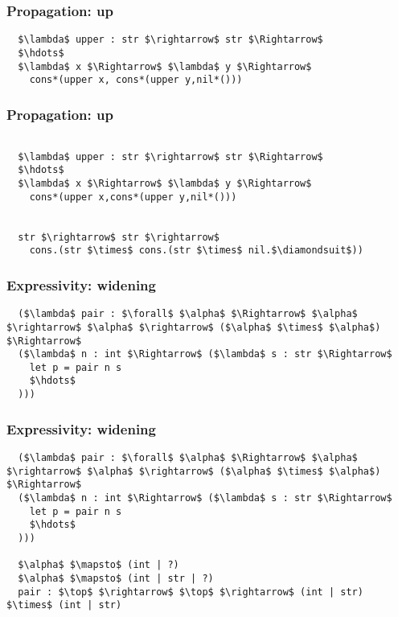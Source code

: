 \documentclass{beamer}
\begin{document}
\begin{frame}[fragile]
  \frametitle{Propagation: up}

  \begin{lstlisting}
  $\lambda$ upper : str $\rightarrow$ str $\Rightarrow$
  $\hdots$
  $\lambda$ x $\Rightarrow$ $\lambda$ y $\Rightarrow$
    cons*(upper x, cons*(upper y,nil*()))
  \end{lstlisting}

\end{frame}

\begin{frame}[fragile]
  \frametitle{Propagation: up}

  \begin{lstlisting}

  $\lambda$ upper : str $\rightarrow$ str $\Rightarrow$
  $\hdots$
  $\lambda$ x $\Rightarrow$ $\lambda$ y $\Rightarrow$
    cons*(upper x,cons*(upper y,nil*()))


  str $\rightarrow$ str $\rightarrow$
    cons.(str $\times$ cons.(str $\times$ nil.$\diamondsuit$))
  \end{lstlisting}

\end{frame}

\begin{frame}[fragile]
  \frametitle{Expressivity: widening}

  \begin{lstlisting}
  ($\lambda$ pair : $\forall$ $\alpha$ $\Rightarrow$ $\alpha$ $\rightarrow$ $\alpha$ $\rightarrow$ ($\alpha$ $\times$ $\alpha$) $\Rightarrow$ 
  ($\lambda$ n : int $\Rightarrow$ ($\lambda$ s : str $\Rightarrow$ 
    let p = pair n s
    $\hdots$
  )))

  \end{lstlisting}
\end{frame}


\begin{frame}[fragile]
  \frametitle{Expressivity: widening}

  \begin{lstlisting}
  ($\lambda$ pair : $\forall$ $\alpha$ $\Rightarrow$ $\alpha$ $\rightarrow$ $\alpha$ $\rightarrow$ ($\alpha$ $\times$ $\alpha$) $\Rightarrow$ 
  ($\lambda$ n : int $\Rightarrow$ ($\lambda$ s : str $\Rightarrow$ 
    let p = pair n s
    $\hdots$
  )))

  $\alpha$ $\mapsto$ (int | ?) 
  $\alpha$ $\mapsto$ (int | str | ?)
  pair : $\top$ $\rightarrow$ $\top$ $\rightarrow$ (int | str) $\times$ (int | str)

  \end{lstlisting}
\end{frame}
\end{document}
